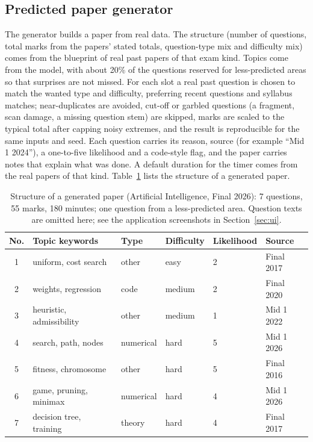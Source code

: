\documentclass[11pt,a4paper]{article}
\begin{document}
\subsection{Predicted paper generator}
The generator builds a paper from real data. The structure (number of questions, total marks from the papers' stated totals,
question-type mix and difficulty mix) comes from the blueprint of real past papers of that exam kind. Topics come from the model,
with about 20\% of the questions reserved for less-predicted areas so that surprises are not missed. For each slot a real past
question is chosen to match the wanted type and difficulty, preferring recent questions and syllabus matches; near-duplicates are
avoided, cut-off or garbled questions (a fragment, scan damage, a missing question stem) are skipped, marks are scaled to the
typical total after capping noisy extremes, and the result is reproducible for the same inputs and seed. Each question carries
its reason, source (for example ``Mid 1 2024''), a one-to-five likelihood and a code-style flag, and the paper carries notes
that explain what was done. A default duration for the timer comes from the real papers of that kind. Table~\ref{tab:sample} lists
the structure of a generated paper.

\begin{table}[!htb]
\centering
\small
\begin{tabular}{clllll}
\toprule
No. & Topic keywords & Type & Difficulty & Likelihood & Source \\
\midrule
1 & uniform, cost search & other & easy & 2 & Final 2017 \\
2 & weights, regression & code & medium & 2 & Final 2020 \\
3 & heuristic, admissibility & other & medium & 1 & Mid 1 2022 \\
4 & search, path, nodes & numerical & hard & 5 & Mid 1 2026 \\
5 & fitness, chromosome & other & hard & 5 & Final 2016 \\
6 & game, pruning, minimax & numerical & hard & 4 & Mid 1 2026 \\
7 & decision tree, training & theory & hard & 4 & Final 2017 \\
\bottomrule
\end{tabular}
\caption{Structure of a generated paper (Artificial Intelligence, Final 2026): 7 questions, 55 marks, 180 minutes; one
question from a less-predicted area. Question texts are omitted here; see the application screenshots in Section~\ref{sec:ui}.}
\label{tab:sample}
\end{table}
\end{document}

